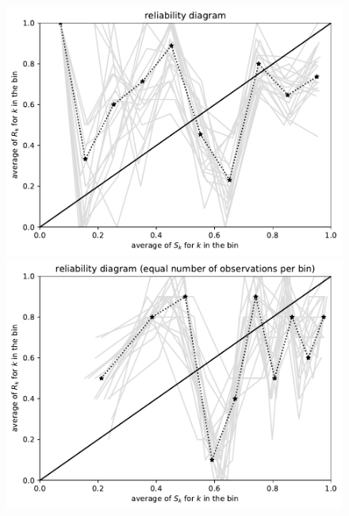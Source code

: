 \documentclass{article}
\begin{document}
\begin{figure}
\begin{centering}
\parbox{\imsize}{\includegraphics[width=\imsize]
                {./codes/unweighted/100_10_2_1/equiprob.pdf}}
\quad\quad
\parbox{\imsize}{\includegraphics[width=\imsize]
                {./codes/unweighted/100_10_2_1/equisamp.pdf}}

\vspace{\vertsep}


\end{centering}
\end{figure}
\end{document}
